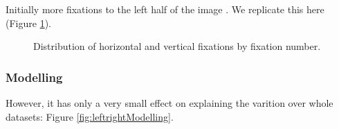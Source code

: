 \documentclass[a4paper, onecolumn, oneside, 11pt]{article}
\begin{document}
Initially more fixations to the left half of the image \citep{nuthmann-matthias2014}. We replicate this here (Figure \ref{fig:leftrightDist}).

\begin{figure}
\centering
{}
\caption{Distribution of horizontal and vertical fixations by fixation number.}
\label{fig:leftrightDist}
\end{figure}

\subsubsection{Modelling}

However, it has only a very small effect on explaining the varition over whole datasets: Figure \ref{fig:leftrightModelling}.
\end{document}
